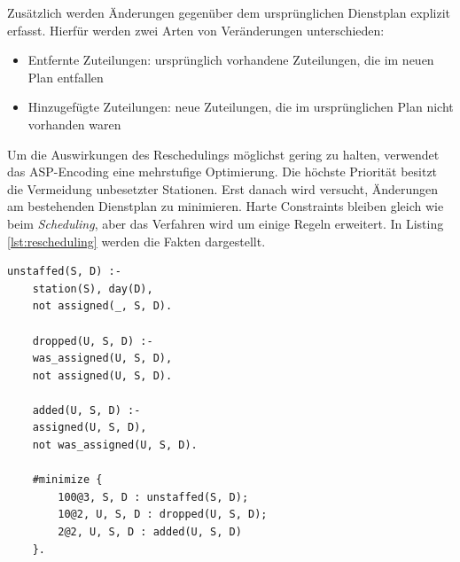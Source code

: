 Zusätzlich werden Änderungen gegenüber dem ursprünglichen Dienstplan explizit erfasst. Hierfür werden zwei Arten von Veränderungen unterschieden:

\begin{itemize}
\item{	Entfernte Zuteilungen: ursprünglich vorhandene Zuteilungen, die im neuen Plan entfallen}
\item{	Hinzugefügte Zuteilungen: neue Zuteilungen, die im ursprünglichen Plan nicht vorhanden waren}
\end{itemize}


Um die Auswirkungen des Reschedulings möglichst gering zu halten, verwendet das ASP-Encoding eine mehrstufige Optimierung. Die höchste Priorität besitzt die Vermeidung unbesetzter Stationen. Erst danach wird versucht, Änderungen am bestehenden Dienstplan zu minimieren. Harte Constraints bleiben gleich wie beim \textit{Scheduling}, aber das Verfahren wird um einige Regeln erweitert. In Listing \ref{lst:rescheduling} werden die Fakten dargestellt.

\begin{lstlisting}[caption={Rescheduling},label={lst:rescheduling}]
	unstaffed(S, D) :-
	station(S), day(D),
	not assigned(_, S, D).
	
	dropped(U, S, D) :-
	was_assigned(U, S, D),
	not assigned(U, S, D).
	
	added(U, S, D) :-
	assigned(U, S, D),
	not was_assigned(U, S, D).

	#minimize {
		100@3, S, D : unstaffed(S, D);
		10@2, U, S, D : dropped(U, S, D);
		2@2, U, S, D : added(U, S, D)
	}.
\end{lstlisting}

